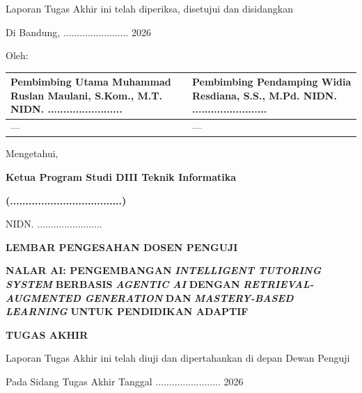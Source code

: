 \documentclass[12pt,a4paper]{article}
\begin{document}
Laporan Tugas Akhir ini telah diperiksa, disetujui dan disidangkan



Di Bandung, ........................ 2026



Oleh:



\begin{table}[h]

\centering

\begin{tabular}{ll}

\toprule

Pembimbing Utama Muhammad Ruslan Maulani, S.Kom., M.T. NIDN. ........................ & Pembimbing Pendamping Widia Resdiana, S.S., M.Pd. NIDN. ........................ \\

\midrule

--- & --- \\

\bottomrule

\end{tabular}

\end{table}

Mengetahui,



\textbf{Ketua Program Studi DIII Teknik Informatika}



\textbf{(....................................)}



NIDN. ........................



\newpage

\textbf{LEMBAR PENGESAHAN DOSEN PENGUJI}



\textbf{NALAR AI: PENGEMBANGAN} \textbf{\textit{INTELLIGENT TUTORING SYSTEM}} \textbf{BERBASIS} \textbf{\textit{AGENTIC AI}} \textbf{DENGAN} \textbf{\textit{RETRIEVAL-AUGMENTED GENERATION}} \textbf{DAN} \textbf{\textit{MASTERY-BASED LEARNING}} \textbf{UNTUK PENDIDIKAN ADAPTIF}



\textbf{TUGAS AKHIR}



Laporan Tugas Akhir ini telah diuji dan dipertahankan di depan Dewan Penguji



Pada Sidang Tugas Akhir Tanggal ........................ 2026
\end{document}
